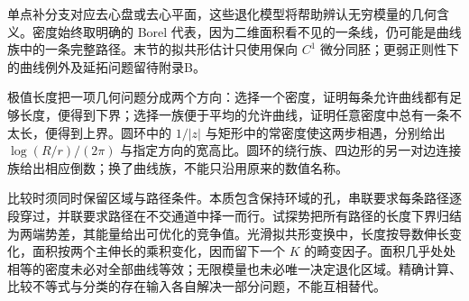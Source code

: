 \ProseParagraphBreak

单点补分支对应去心盘或去心平面，这些退化模型将帮助辨认无穷模量的几何含义。密度始终取明确的 Borel 代表，因为二维面积看不见的一条线，仍可能是曲线族中的一条完整路径。末节的拟共形估计只使用保向 \(C^1\) 微分同胚；更弱正则性下的曲线例外及延拓问题留待附录B。






\begin{chaptersummary}
极值长度把一项几何问题分成两个方向：选择一个密度，证明每条允许曲线都有足够长度，便得到下界；选择一族便于平均的允许曲线，证明任意密度中总有一条不太长，便得到上界。圆环中的 \(1/|z|\) 与矩形中的常密度使这两步相遇，分别给出 \(\log(R/r)/(2\pi)\) 与指定方向的宽高比。圆环的绕行族、四边形的另一对边连接族给出相应倒数；换了曲线族，不能只沿用原来的数值名称。

\ProseParagraphBreak

比较时须同时保留区域与路径条件。本质包含保持环域的孔，串联要求每条路径逐段穿过，并联要求路径在不交通道中择一而行。试探势把所有路径的长度下界归结为两端势差，其能量给出可优化的竞争值。光滑拟共形变换中，长度按导数伸长变化，面积按两个主伸长的乘积变化，因而留下一个 \(K\) 的畸变因子。面积几乎处处相等的密度未必对全部曲线等效；无限模量也未必唯一决定退化区域。精确计算、比较不等式与分类的存在输入各自解决一部分问题，不能互相替代。
\end{chaptersummary}

\BookExercises

